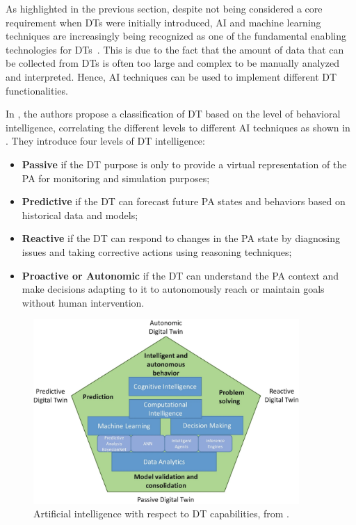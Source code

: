 As highlighted in the previous section, 
despite not being considered a core requirement when \acp{DT} were initially introduced,
\ac{AI} and machine learning techniques are increasingly being recognized as one of the fundamental enabling technologies for \acp{DT}~\cite{Kreuzer_Papapetrou_Zdravkovic_2024}.
%
This is due to the fact that the amount of data that can be collected from \acp{DT} is often too large and complex to be manually analyzed and interpreted. 
%
Hence, \ac{AI} techniques can be used to implement different \ac{DT} functionalities. 

In \cite{Minerva_Crespi_Farahbakhsh_Awan_2023}, the authors propose a classification of \ac{DT} based on the level of behavioral intelligence, correlating the different levels to different \ac{AI} techniques as shown in .
%
They introduce four levels of \ac{DT} intelligence: 
\begin{itemize}
    \item \textbf{Passive} if the \ac{DT} purpose is only to provide a virtual representation of the \ac{PA} for monitoring and simulation purposes;
    \item \textbf{Predictive} if the \ac{DT} can forecast future \ac{PA} states and behaviors based on historical data and models;
    \item \textbf{Reactive} if the \ac{DT} can respond to changes in the \ac{PA} state by diagnosing issues and taking corrective actions using reasoning techniques;
    \item \textbf{Proactive or Autonomic} if the \ac{DT} can understand the \ac{PA} context and make decisions adapting to it to autonomously reach or maintain goals without human intervention.
\end{itemize}

\begin{figure}[t]
    \centering
    \includegraphics[width=0.9\textwidth]{figures/AI_DT_pentagon.pdf}
    \caption{Artificial intelligence with respect to \ac{DT} capabilities, from \cite{Minerva_Crespi_Farahbakhsh_Awan_2023}.}
    \label{fig:ai-dt-pentagon}
\end{figure}

